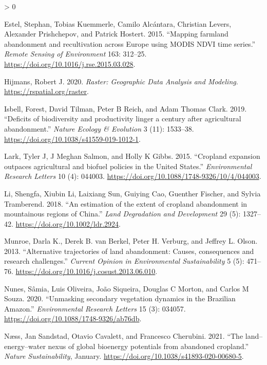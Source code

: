 \documentclass[
]{article}
\newlength{\cslhangindent}
\newenvironment{CSLReferences}[2] %
 {%
  \setlength{\parindent}{0pt}
  \ifodd #1 \everypar{\setlength{\hangindent}{\cslhangindent}}\ignorespaces\fi
  \ifnum #2 > 0
  \setlength{\parskip}{#2\baselineskip}
  \fi
 }%
 {}
\begin{document}
\begin{CSLReferences}{1}{0}
\leavevmode\hypertarget{ref-Estel2015}{}%
Estel, Stephan, Tobias Kuemmerle, Camilo Alcántara, Christian Levers, Alexander Prishchepov, and Patrick Hostert. 2015. {``{Mapping farmland abandonment and recultivation across Europe using MODIS NDVI time series}.''} \emph{Remote Sensing of Environment} 163: 312--25. \url{https://doi.org/10.1016/j.rse.2015.03.028}.

\leavevmode\hypertarget{ref-R-raster}{}%
Hijmans, Robert J. 2020. \emph{Raster: Geographic Data Analysis and Modeling}. \url{https://rspatial.org/raster}.

\leavevmode\hypertarget{ref-Isbell2019}{}%
Isbell, Forest, David Tilman, Peter B Reich, and Adam Thomas Clark. 2019. {``{Deficits of biodiversity and productivity linger a century after agricultural abandonment}.''} \emph{Nature Ecology {\&} Evolution} 3 (11): 1533--38. \url{https://doi.org/10.1038/s41559-019-1012-1}.

\leavevmode\hypertarget{ref-Lark2015}{}%
Lark, Tyler J, J Meghan Salmon, and Holly K Gibbs. 2015. {``{Cropland expansion outpaces agricultural and biofuel policies in the United States}.''} \emph{Environmental Research Letters} 10 (4): 044003. \url{https://doi.org/10.1088/1748-9326/10/4/044003}.

\leavevmode\hypertarget{ref-Li2018}{}%
Li, Shengfa, Xiubin Li, Laixiang Sun, Guiying Cao, Guenther Fischer, and Sylvia Tramberend. 2018. {``{An estimation of the extent of cropland abandonment in mountainous regions of China}.''} \emph{Land Degradation and Development} 29 (5): 1327--42. \url{https://doi.org/10.1002/ldr.2924}.

\leavevmode\hypertarget{ref-Munroe2013}{}%
Munroe, Darla K., Derek B. van Berkel, Peter H. Verburg, and Jeffrey L. Olson. 2013. {``{Alternative trajectories of land abandonment: Causes, consequences and research challenges}.''} \emph{Current Opinion in Environmental Sustainability} 5 (5): 471--76. \url{https://doi.org/10.1016/j.cosust.2013.06.010}.

\leavevmode\hypertarget{ref-Nunes2020}{}%
Nunes, Sâmia, Luis Oliveira, João Siqueira, Douglas C Morton, and Carlos M Souza. 2020. {``{Unmasking secondary vegetation dynamics in the Brazilian Amazon}.''} \emph{Environmental Research Letters} 15 (3): 034057. \url{https://doi.org/10.1088/1748-9326/ab76db}.

\leavevmode\hypertarget{ref-Naess2021}{}%
Næss, Jan Sandstad, Otavio Cavalett, and Francesco Cherubini. 2021. {``{The land--energy--water nexus of global bioenergy potentials from abandoned cropland}.''} \emph{Nature Sustainability}, January. \url{https://doi.org/10.1038/s41893-020-00680-5}.


\end{CSLReferences}
\end{document}
